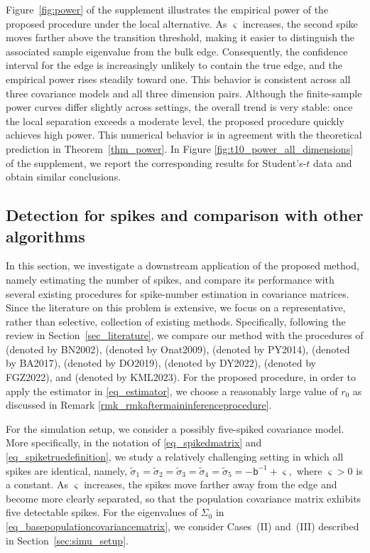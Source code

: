 \documentclass[12pt]{article}
\theoremstyle{plain}
\numberwithin{equation}{section}
\begin{document}
Figure~\ref{fig:power} of the supplement illustrates the empirical power of the proposed procedure under the local alternative. As $\varsigma$ increases, the second spike moves farther above the transition threshold, making it easier to distinguish the associated sample eigenvalue from the bulk edge. Consequently, the confidence interval for the edge is increasingly unlikely to contain the true edge, and the empirical power rises steadily toward one. This behavior is consistent across all three covariance models and all three dimension pairs. Although the finite-sample power curves differ slightly across settings, the overall trend is very stable: once the local separation exceeds a moderate level, the proposed procedure quickly achieves high power. This numerical behavior is in agreement with the theoretical prediction in Theorem~\ref{thm_power}.  In Figure \ref{fig:t10_power_all_dimensions} of the supplement, we report the corresponding results for Student's-$t$ data and obtain similar conclusions.


\subsection{Detection for spikes and comparison with other algorithms}\label{sec_simudetectionofspike}
In this section, we investigate a downstream application of the proposed method, namely estimating the number of spikes, and compare its performance with several existing procedures for spike-number estimation in covariance matrices. Since the literature on this problem is extensive, we focus on a representative, rather than selective, collection of existing methods. Specifically, following the review in Section~\ref{sec_literature}, we compare our method with the procedures of \citep{bai2002determining} (denoted by BN2002), \citep{onatski2009formal} (denoted by Onat2009), \citep{passemier2014estimation} (denoted by PY2014), \citep{braeken2017empirical} (denoted by BA2017), \citep{dobriban2019deterministic} (denoted by DO2019), \citep{9779233} (denoted by DY2022), \citep{fan2022estimating} (denoted by FGZ2022), and \citep{ke2023estimation} (denoted by KML2023). For the proposed procedure, in order to apply the estimator in \eqref{eq_estimator}, we choose a reasonably large value of $r_0$ as discussed in Remark \ref{rmk_rmkaftermaininferenceprocedure}.


For the simulation setup, we consider a possibly five-spiked covariance model. More specifically, in the notation of \eqref{eq_spikedmatrix} and \eqref{eq_spiketruedefinition}, we study a relatively challenging setting in which all spikes are identical, namely, $\widetilde{\sigma}_1=\widetilde{\sigma}_2=\widetilde{\sigma}_3=\widetilde{\sigma}_4=\widetilde{\sigma}_5=-\mathsf b^{-1}+\varsigma, $ where $\varsigma>0$ is a constant. As $\varsigma$ increases, the spikes move farther away from the edge and become more clearly separated, so that the population covariance matrix exhibits five detectable spikes. For the eigenvalues of $\Sigma_0$ in \eqref{eq_basepopulationcovariancematrix}, we consider Cases~(II) and~(III) described in Section~\ref{sec:simu_setup}.
\end{document}
